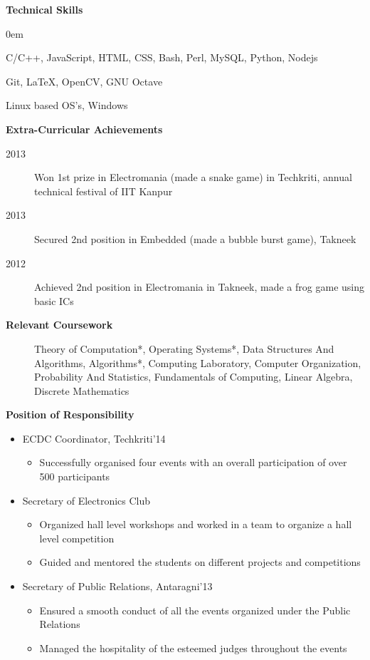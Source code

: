 \documentclass[letterpaper,9pt]{extarticle}
\newcommand{\resheading}[1]{{\large \colorbox{mygrey}{\begin{minipage}{\textwidth}{\textbf{#1 \vphantom{p\^{E}}}}\end{minipage}}}}
\begin{document}
\resheading{Technical Skills}

\begin{description}
\itemsep0em
\item[Programming Languages:]
C/C++, JavaScript, HTML, CSS, Bash, Perl, MySQL, Python, Nodejs
\item[Other Tools:]
Git, \LaTeX, OpenCV, GNU Octave
\item[Operating Systems:]
Linux based OS's, Windows
\end{description}

\resheading{Extra-Curricular Achievements}
\begin{description}
\item[2013] Won 1st prize in Electromania (made a snake game) in Techkriti, annual technical festival of IIT Kanpur
\item[2013] Secured 2nd position in Embedded (made a bubble burst game), Takneek
\item[2012] Achieved 2nd position in Electromania in Takneek, made a frog game using basic ICs
\end{description}

\resheading{Relevant Coursework}
\begin{description}
\item[]
Theory of Computation*,
Operating Systems*,
Data Structures And Algorithms,
Algorithms*,
Computing Laboratory,
Computer Organization, 
Probability And Statistics,
Fundamentals of Computing,
Linear Algebra,
Discrete Mathematics
\end{description}

\resheading{Position of Responsibility}
\begin{itemize}
\itemsep0em
\item ECDC Coordinator, Techkriti'14
	\begin{itemize}
	\itemsep0em
	\item Successfully organised four events with an overall participation of over 500 participants
	\end{itemize}
\item Secretary of Electronics Club
	\begin{itemize}
	\itemsep0em
		\item Organized hall level workshops and worked in a team to organize a hall level competition
		\item Guided and mentored the students on different projects and competitions
	\end{itemize}
\item Secretary of Public Relations, Antaragni'13
	\begin{itemize}
		\itemsep0em
		\item Ensured a smooth conduct of all the events organized under the Public Relations
		\item Managed the hospitality of the esteemed judges throughout the events
	\end{itemize}
\end{itemize}
\end{document}
